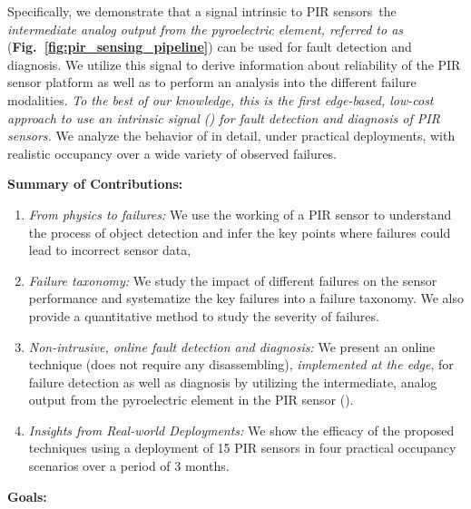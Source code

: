 Specifically, we demonstrate that a signal intrinsic to PIR sensors~\viz the \textit{intermediate analog output from the pyroelectric element, referred to as \aout} ({\bfseries Fig.~\ref{fig:pir_sensing_pipeline}}) can be used for %
fault detection and diagnosis. %
We utilize this signal to derive information about reliability of the PIR sensor platform as well as to perform an analysis into the different failure modalities. \textit{To the best of our knowledge, this is the first edge-based, low-cost approach to use an intrinsic signal (\aout) for fault detection and diagnosis of PIR sensors.} We analyze the behavior of \aout in detail, under %
practical deployments, with realistic occupancy
over a wide variety of observed failures. 

\noindent \textbf{Summary of Contributions:}
\begin{enumerate}[leftmargin=*]
	\itemsep0pt
	\item \textit{From physics to failures:} We use the working of a PIR sensor to understand the process of object detection and infer the key points where failures could lead to incorrect sensor data,
	\item \textit{Failure taxonomy:} We study the impact of different failures on the sensor performance and systematize the key failures into a failure taxonomy. We also provide a quantitative method to study the severity of failures.
	
	\item \textit{Non-intrusive, online fault detection and diagnosis:} We present an online technique (does not require any disassembling), \emph{implemented at the edge}, for failure detection as well as diagnosis by utilizing the intermediate, analog output from the pyroelectric element in the PIR sensor (\aout). 
	\item \textit{Insights from Real-world Deployments:} We show the efficacy of the proposed techniques using a deployment of 15 PIR sensors in four practical occupancy scenarios over a period of 3 months.
\end{enumerate}




\noindent \textbf{Goals:}

